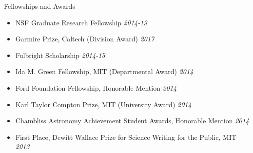 \documentclass{resume} %
\begin{document}
\begin{rSection}{Fellowships and Awards}

\begin{itemize}
\item
NSF Graduate Research Fellowship \hfill {\em 2014-19}
\item
Garmire Prize, Caltech (Division Award) \hfill {\em 2017}
\item
Fulbright Scholarship \hfill {\em 2014-15}
\item
Ida M. Green Fellowship, MIT (Departmental Award) \hfill {\em 2014} 
\item
Ford Foundation Fellowship, Honorable Mention \hfill {\em 2014} 
\item
Karl Taylor Compton Prize, MIT (University Award) \hfill {\em 2014} 
\item
Chambliss Astronomy Achievement Student Awards, Honorable Mention \hfill {\em 2014}
\item
First Place, Dewitt Wallace Prize for Science Writing for the Public, MIT \hfill {\em 2013} 
\end{itemize}

\end{rSection}

\end{document}
